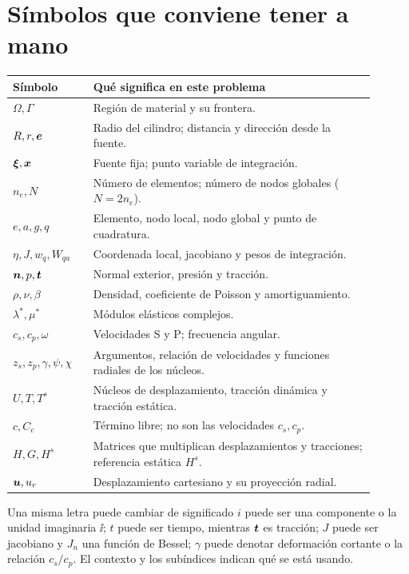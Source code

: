 \documentclass[11pt]{article}
\begin{document}
\section*{Símbolos que conviene tener a mano}
\begin{center}
\small
\begin{tabular}{p{0.20\linewidth}p{0.70\linewidth}}
\toprule
Símbolo & Qué significa en este problema\\
\midrule
\(\Omega,\Gamma\) & Región de material y su frontera.\\
\(R,r,\bm{e}\) & Radio del cilindro; distancia y dirección desde la fuente.\\
\(\bm{\xi},\bm{x}\) & Fuente fija; punto variable de integración.\\
\(n_e,N\) & Número de elementos; número de nodos globales (\(N=2n_e\)).\\
\(e,a,g,q\) & Elemento, nodo local, nodo global y punto de cuadratura.\\
\(\eta,J,w_q,W_{qa}\) & Coordenada local, jacobiano y pesos de integración.\\
\(\bm{n},p,\bm{t}\) & Normal exterior, presión y tracción.\\
\(\rho,\nu,\beta\) & Densidad, coeficiente de Poisson y amortiguamiento.\\
\(\lambda^*,\mu^*\) & Módulos elásticos complejos.\\
\(c_s,c_p,\omega\) & Velocidades S y P; frecuencia angular.\\
\(z_s,z_p,\gamma,\psi,\chi\) & Argumentos, relación de velocidades y
funciones radiales de los núcleos.\\
\(U,T,T^s\) & Núcleos de desplazamiento, tracción dinámica y tracción estática.\\
\(c,C_c\) & Término libre; no son las velocidades \(c_s,c_p\).\\
\(H,G,H^s\) & Matrices que multiplican desplazamientos y tracciones;
referencia estática \(H^s\).\\
\(\bm{u},u_r\) & Desplazamiento cartesiano y su proyección radial.\\
\bottomrule
\end{tabular}
\end{center}

\begin{alerta}{Una misma letra puede cambiar de significado}
\(i\) puede ser una componente o la unidad imaginaria \(\ii\);
\(t\) puede ser tiempo, mientras \(\bm{t}\) es tracción;
\(J\) puede ser jacobiano y \(J_n\) una función de Bessel;
\(\gamma\) puede denotar deformación cortante o la relación \(c_s/c_p\).
El contexto y los subíndices indican qué se está usando.
\end{alerta}

\par{}
\end{document}
